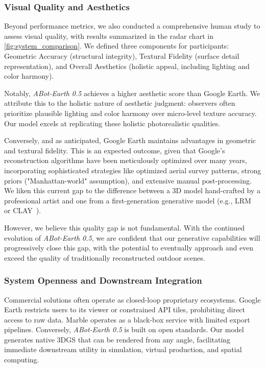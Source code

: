 \documentclass{llmxive}
\providecommand{\method}{\textit{ABot-Earth 0.5}\xspace}
\begin{document}
\subsubsection{Visual Quality and Aesthetics}
Beyond performance metrics, we also conducted a comprehensive human study to assess visual quality, with results summarized in the radar chart in \cref{fig:system_comparison}. We defined three components for participants: Geometric Accuracy (structural integrity), Textural Fidelity (surface detail representation), and Overall Aesthetics (holistic appeal, including lighting and color harmony).

Notably, \method{} achieves a higher aesthetic score than Google Earth. We attribute this to the holistic nature of aesthetic judgment: observers often prioritize plausible lighting and color harmony over micro-level texture accuracy. Our model excels at replicating these holistic photorealistic qualities.

Conversely, and as anticipated, Google Earth maintains advantages in geometric and textural fidelity. This is an expected outcome, given that Google's reconstruction algorithms have been meticulously optimized over many years, incorporating sophisticated strategies like optimized aerial survey patterns, strong priors ("Manhattan-world" assumption), and extensive manual post-processing. We liken this current gap to the difference between a 3D model hand-crafted by a professional artist and one from a first-generation generative model (e.g., LRM~\cite{hong2024lrm} or CLAY~\cite{CLAY}).

However, we believe this quality gap is not fundamental. With the continued evolution of \method{}, we are confident that our generative capabilities will progressively close this gap, with the potential to eventually approach and even exceed the quality of traditionally reconstructed outdoor scenes.




\subsubsection{System Openness and Downstream Integration}
Commercial solutions often operate as closed-loop proprietary ecosystems. Google Earth restricts users to its viewer or constrained API tiles, prohibiting direct access to raw data. Marble operates as a black-box service with limited export pipelines. Conversely, \method{} is built on open standards. Our model generates native 3DGS that can be rendered from any angle, facilitating immediate downstream utility in simulation, virtual production, and spatial computing.
\end{document}
